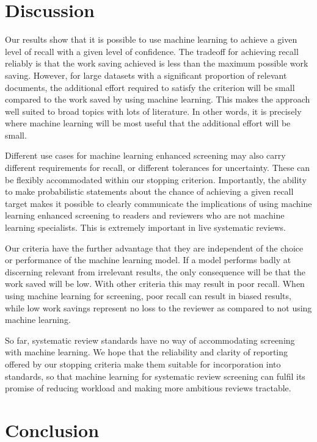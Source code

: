 \documentclass{bmcart}
\begin{document}
	\section*{Discussion}
	
	Our results show that it is possible to use machine learning to achieve a given level of recall with a given level of confidence. The tradeoff for achieving recall reliably is that the work saving achieved is less than the maximum possible work saving. However, for large datasets with a significant proportion of relevant documents, the additional effort required to satisfy the criterion will be small compared to the work saved by using machine learning. This makes the approach well suited to broad topics with lots of literature. In other words, it is precisely where machine learning will be most useful that the additional effort will be small.
	
	Different use cases for machine learning enhanced screening may also carry different requirements for recall, or different tolerances for uncertainty. These can be flexibly accommodated within our stopping criterion. Importantly, the ability to make probabilistic statements about the chance of achieving a given recall target makes it possible to clearly communicate the implications of using machine learning enhanced screening to readers and reviewers who are not machine learning specialists. This is extremely important in live systematic reviews. 
	
	Our criteria have the further advantage that they are independent of the choice or performance of the machine learning model. If a model performs badly at discerning relevant from irrelevant results, the only consequence will be that the work saved will be low. With other criteria this may result in poor recall. 
	When using machine learning for screening, poor recall can result in biased results, while low work savings represent no loss to the reviewer as compared to not using machine learning.
	
	So far, systematic review standards have no way of accommodating screening with machine learning. 
	We hope that the reliability and clarity of reporting offered by our stopping criteria make them suitable for incorporation into standards, so that machine learning for systematic review screening can fulfil its promise of reducing workload and making more ambitious reviews tractable.
	
	\section*{Conclusion}
	
\end{document}
